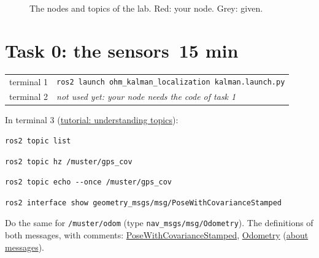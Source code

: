\documentclass[11pt,a4paper,parskip=half]{scrartcl}
\makeatletter
\newcommand{\thema}[1]{\texttt{#1}}
\newcommand{\minutes}[1]{\texorpdfstring{\hfill{\normalsize\mdseries\color{ohmgrey}\faClock[regular]~#1 min}}{}}
\newcommand{\runningtext}[2]{\begin{tcolorbox}[base, colback=black!3, borderline west={2.5pt}{0pt}{ohmgrey},
        title={\faTerminal~Running}, coltitle=ohmgrey, colbacktitle=black!3, fonttitle=\small\bfseries,
        toptitle=2pt, bottomtitle=0pt, fontupper=\small]
  \begin{tabularx}{\linewidth}{@{}>{\color{ohmgrey}}l >{\raggedright\arraybackslash}X@{}}
    terminal 1 & #1 \\
    terminal 2 & #2
  \end{tabularx}
\end{tcolorbox}}
\newcommand{\launchcmd}{\texttt{ros2 launch ohm\_kalman\_localization kalman.launch.py}}
\newcommand{\notyet}[1]{\textcolor{ohmgrey}{\emph{#1}}}
\makeatother
\begin{document}
\begin{figure}[!hb]
  \centering
  \resizebox{\linewidth}{!}{}
  \caption{The nodes and topics of the lab. Red: your node. Grey: given.}
  \label{fig:nodes}
\end{figure}

\clearpage
\section{Task 0: the sensors\minutes{15}}
\label{sec:task0}
\runningtext{\launchcmd}{\notyet{not used yet: your node needs the code of task 1}}

In terminal 3 (\href{https://docs.ros.org/en/jazzy/Tutorials/Beginner-CLI-Tools/Understanding-ROS2-Topics/Understanding-ROS2-Topics.html}{tutorial: understanding topics}):
\begin{lstlisting}
ros2 topic list
\end{lstlisting}
\begin{lstlisting}
ros2 topic hz /muster/gps_cov
\end{lstlisting}
\begin{lstlisting}
ros2 topic echo --once /muster/gps_cov
\end{lstlisting}
\begin{lstlisting}
ros2 interface show geometry_msgs/msg/PoseWithCovarianceStamped
\end{lstlisting}
Do the same for \thema{/muster/odom} (type \thema{nav\_msgs/msg/Odometry}). The definitions of both messages,
with comments: \href{https://github.com/ros2/common_interfaces/blob/jazzy/geometry_msgs/msg/PoseWithCovarianceStamped.msg}{PoseWithCovarianceStamped},
\href{https://github.com/ros2/common_interfaces/blob/jazzy/nav_msgs/msg/Odometry.msg}{Odometry}
(\href{https://docs.ros.org/en/jazzy/Concepts/Basic/About-Interfaces.html}{about messages}).
\end{document}
